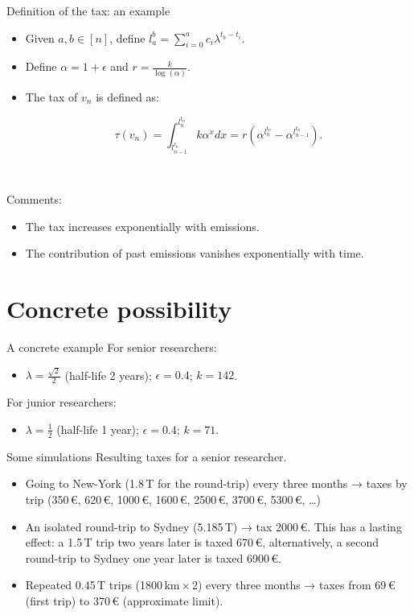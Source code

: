 \documentclass[french, english]{beamer}
\begin{document}
\begin{frame}{Definition of the tax: an example}
    \begin{itemize}
    \item Given $a,b \in [n]$, define $l_a^{b} = \sum_{i = 0}^a c_i \lambda^{t_b - t_i}$.
    \item Define $\alpha = 1 + \epsilon$ and $r = \frac{k}{\log(\alpha)}$.
    \item The tax of $v_n$ is defined as: \begin{tcolorbox}$$ \tau(v_n) = \int_{l_{n-1}^{t_n}}^{l_n^{t_n}} k \alpha^x dx = r (\alpha^{l_n^{t_n}} - \alpha^{l_{n - 1}^{t_n}}).$$\end{tcolorbox}
    \end{itemize}	
    
    \

   Comments:
   \begin{itemize}
   \item The tax increases exponentially with emissions.
   \item The contribution of past emissions vanishes exponentially with time.
   \end{itemize}

\end{frame}

\section{Concrete possibility}
\begin{frame}{A concrete example}
For senior researchers: 
    \begin{itemize}
    	\item $\lambda = \frac{\sqrt{2}}{2}$ (half-life 2 years); $\epsilon = 0.4$; $k = 142$.
	\end{itemize}
For junior researchers: 
    \begin{itemize}
    	\item $\lambda = \frac{1}{2}$ (half-life 1 year); $\epsilon = 0.4$; $k = 71$.
	\end{itemize}
\end{frame}

\begin{frame}{Some simulations}
Resulting taxes for a senior researcher.
    \begin{itemize}
	\item Going to New-York (1.8\,T for the round-trip) every three months → taxes by trip (350\,€, 620\,€, 1000\,€, 1600\,€, 2500\,€, 3700\,€, 5300\,€, …)
	\item An isolated round-trip to Sydney (5.185\,T) → tax 2000\,€. This has a lasting effect: a 1.5\,T trip two years later is taxed 670\,€, alternatively, a second round-trip to Sydney one year later is taxed 6900\,€.
	\item Repeated 0.45\,T trips (1800\,km\,×\,2) every three months → taxes from 69\,€ (first trip) to 370\,€ (approximate limit).
	\end{itemize}
\end{frame}
\end{document}
